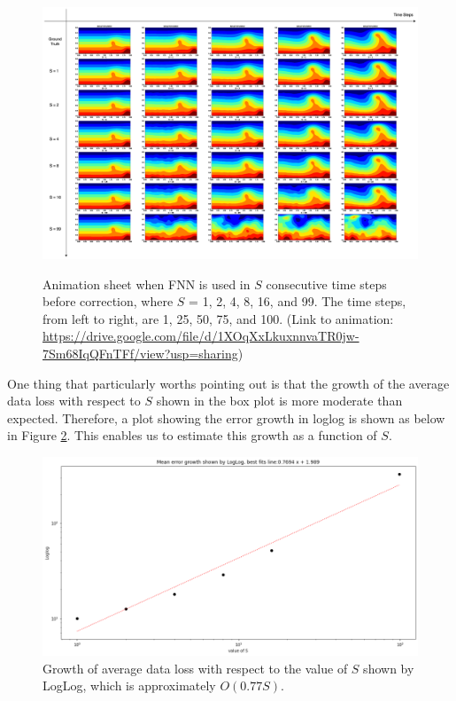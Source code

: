\begin{figure}[H]
    \centering
    \caption{Animation sheet when FNN is used in $S$ consecutive time steps before correction, where $S$ = 1, 2, 4, 8, 16, and 99. The time steps, from left to right, are 1, 25, 50, 75, and 100. (Link to animation: \url{https://drive.google.com/file/d/1XOqXxLkuxnnvaTR0jw-7Sm68IqQFnTFf/view?usp=sharing})}
    \includegraphics[scale=0.30]{figures/mantle_convection_images/further_testings/FNN_further_testing_sheet.png}
    \label{figure:further_GIF}
\end{figure}

One thing that particularly worths pointing out is that the growth of the average data loss with respect to $S$ shown in the box plot is more moderate than expected. Therefore, a plot showing the error growth in loglog is shown as below in Figure \ref{figure:further_loglog}. This enables us to estimate this growth as a function of $S$.

\begin{figure}[H]
    \centering
    \includegraphics[scale=0.4]{figures/mantle_convection_images/further_testings/FNN_LogLog.png}
    \caption{Growth of average data loss with respect to the value of $S$ shown by LogLog, which is approximately $O(0.77S)$.}
    \label{figure:further_loglog}
\end{figure}

